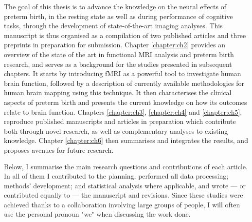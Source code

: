 The goal of this thesis is to advance the knowledge on the neural effects of preterm birth, in the resting state as well as during performance of cognitive tasks, through the development of state-of-the-art imaging analyses. This manuscript is thus organised as a compilation of two published articles and three preprints in preparation for submission. 
Chapter \ref{chapter:ch2} provides an overview of the state of the art in functional MRI analysis and preterm birth research, and serves as a background for the studies presented in subsequent chapters. 
It starts by introducing fMRI as a powerful tool to investigate human brain function, followed by a description of currently available methodologies for human brain mapping using this technique. 
It then characterises the clinical aspects of preterm birth and presents the current knowledge on how its outcomes relate to brain function.
Chapters \ref{chapter:ch3}, \ref{chapter:ch4} and \ref{chapter:ch5}, reproduce published manuscripts and articles in preparation which contribute both through novel research, as well as complementary analyses to existing knowledge.  
Chapter \ref{chapter:ch6} then summarises and integrates the results, and proposes avenues for future research. 

Below, I summarise the main research questions and contributions of each article. 
In all of them I contributed to the planning, performed all data processing; methods' development; and statistical analysis where applicable, and wrote --- or contributed equally to --- the manuscript and revisions. 
Since these studies were achieved thanks to a collaboration involving large groups of people, I will often use the personal pronoun "we" when discussing the work done. 



